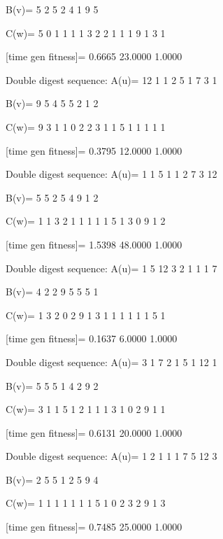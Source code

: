 B(v)=
     5     2     5     2     4     1     9     5

C(w)=
     5     0     1     1     1     1     3     2     2     1     1     1     9     1     3     1

[time gen fitness]=
    0.6665   23.0000    1.0000

Double digest sequence:
A(u)=
    12     1     1     2     5     1     7     3     1

B(v)=
     9     5     4     5     5     2     1     2

C(w)=
     9     3     1     1     0     2     2     3     1     1     5     1     1     1     1     1

[time gen fitness]=
    0.3795   12.0000    1.0000

Double digest sequence:
A(u)=
     1     1     5     1     1     2     7     3    12

B(v)=
     5     5     2     5     4     9     1     2

C(w)=
     1     1     3     2     1     1     1     1     1     5     1     3     0     9     1     2

[time gen fitness]=
    1.5398   48.0000    1.0000

Double digest sequence:
A(u)=
     1     5    12     3     2     1     1     1     7

B(v)=
     4     2     2     9     5     5     5     1

C(w)=
     1     3     2     0     2     9     1     3     1     1     1     1     1     1     5     1

[time gen fitness]=
    0.1637    6.0000    1.0000

Double digest sequence:
A(u)=
     3     1     7     2     1     5     1    12     1

B(v)=
     5     5     5     1     4     2     9     2

C(w)=
     3     1     1     5     1     2     1     1     1     3     1     0     2     9     1     1

[time gen fitness]=
    0.6131   20.0000    1.0000

Double digest sequence:
A(u)=
     1     2     1     1     1     7     5    12     3

B(v)=
     2     5     5     1     2     5     9     4

C(w)=
     1     1     1     1     1     1     1     5     1     0     2     3     2     9     1     3

[time gen fitness]=
    0.7485   25.0000    1.0000

